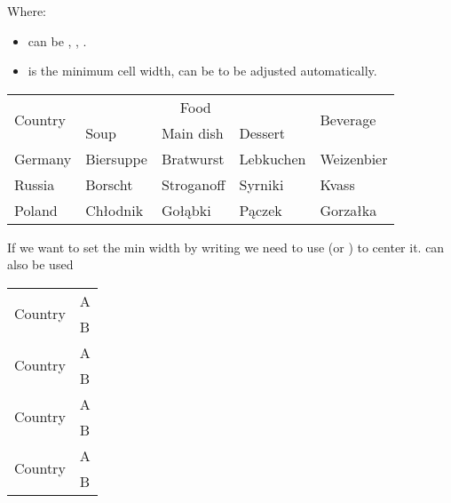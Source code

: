 Where:
\begin{itemize}
\item {} can be , , .
\item {} is the minimum cell width, can be \code{*} to be adjusted automatically.
\end{itemize}

\begin{examplef}
\begin{center}
\begin{tabular}{| l | *{3}{l|}l |} \hline
  \multirow{2}{*}{Country} & \multicolumn{3}{c|}{Food} & \multirow{2}{*}{Beverage}\\
  \cline{2-4}              & Soup & Main dish & Dessert & \\ \hline\hline
  Germany & Biersuppe & Bratwurst & Lebkuchen & Weizenbier\\\hline
  Russia  & Borscht & Stroganoff & Syrniki & Kvass\\\hline
  Poland  & Ch\l{}odnik & Go\l{}\k{a}bki & P\k{a}czek & Gorza\l{}ka \\\hline
\end{tabular}
\end{center}
\end{examplef}

If we want to set the min width by writing  we need to use
\code{\hfill} (or \code{\hfil}) to center it. \code{\centering} can also be used

\begin{example}
\begin{tabular}{| l | l|} \hline
  \multirow{2}{3cm}{\centering Country} & A \\
  \cline{2-2}&              B \\ \hline\hline
  
  \multirow{2}{3cm}{\hfill Country \hfill} & A \\
  \cline{2-2}&              B \\ \hline\hline
  
  \multirow{2}{3cm}{\hfil Country \hfil} & A \\
  \cline{2-2}&              B \\ \hline\hline
  
  \multirow{2}{3cm}{Country} & A \\
  \cline{2-2}&              B \\ \hline
\end{tabular}
\end{example}

